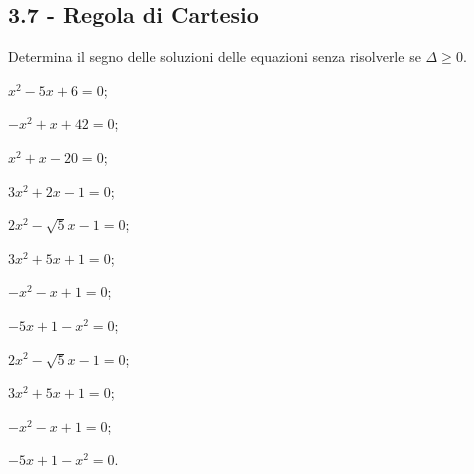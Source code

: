 \pagebreak
\subsection*{3.7 - Regola di Cartesio}

\begin{esercizio}
 \label{ese:3.97}
Determina il segno delle soluzioni delle equazioni senza risolverle se $\Delta \geq 0$.
\begin{multicols}{3}
\begin{enumeratea}
\item $x^{2}-5 x + 6=0$;
\item $- x^{2} + x + 42=0$;
\item $x^{2} + x-20=0$;
\item $3 x^{2} + 2 x-1=0$;
\item $2 x^{2}-\sqrt{5} x-1=0$;
\item $3 x^{2} + 5 x + 1 = 0$;
\item $- x^{2}-x + 1 = 0$;
\item $- 5 x + 1-x^{2} = 0$;
\item $2 x^{2}-\sqrt{5} x-1=0$;
\item $3 x^{2} + 5 x + 1 = 0$;
\item $- x^{2}-x + 1 = 0$;
\item $- 5 x + 1-x^{2} = 0$.
\end{enumeratea}
\end{multicols}
\end{esercizio}

